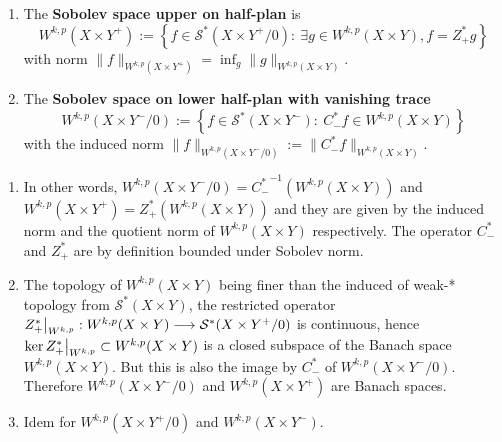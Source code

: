 \begin{definition}
\begin{enumerate}
\item The \textbf{Sobolev space upper on half-plan} is \[ W^{k,p}(X\times Y^+) := \left\{ f\in
   \mathcal{S}^*(X\times Y^+/0):\ \exists g\in W^{k,p}(X\times Y), f= Z_+^* g\right\}\] with norm
\(\|f\|_{W^{k,p}(X\times Y^+)} = \inf_g \|g\|_{W^{k,p}(X\times Y)}\).
\item The \textbf{Sobolev space on lower half-plan with vanishing trace} \[ W^{k,p}(X\times Y^-/0):=
   \left\{f\in \mathcal{S}^*(X\times Y^-):\ C_-^* f\in W^{k,p}(X\times Y)\right\}\] with
the induced norm \(\|f\|_{W^{k,p}(X\times Y^-/0)}:= \|C^*_- f\|_{W^{k,p}(X\times Y)}\).
\end{enumerate}
\end{definition}

\begin{remark}
\begin{enumerate}
\item In other words, \(W^{k,p}(X\times Y^-/0) = {C^*_-}^{-1}(W^{k,p}(X\times Y))\) and
\(W^{k,p}(X\times Y^+) = Z^*_+ (W^{k,p}(X\times Y))\) and they are given by the induced
norm and the quotient norm of \(W^{k,p}(X\times Y)\) respectively. The operator
\(C_-^*\) and \(Z_+^*\) are by definition bounded under Sobolev norm.
\item The topology of \(W^{k,p}(X\times Y)\) being finer than the induced of weak-* topology from \(\mathcal{S}^*(X\times Y)\), the restricted operator \(\restr{Z_+^*}{W^{k,p}}: W^{k,p}(X\times Y)
   \longrightarrow \mathcal{S}^*(X\times Y^+/0)\) is continuous, hence \(\ker
   \restr{Z_+^*}{W^{k,p}}\subset W^{k,p}(X\times Y)\) is a closed subspace of the Banach space \(W^{k,p}(X\times Y)\). But this is also the image by \(C_-^*\) of
\(W^{k,p}(X\times Y^-/0)\). Therefore \(W^{k,p}(X\times Y^-/0)\) and \(W^{k,p}(X\times
   Y^+)\) are Banach spaces.
\item Idem for \(W^{k,p}(X\times Y^+/0)\) and \(W^{k,p}(X\times
   Y^-)\).
\end{enumerate}
\end{remark}


